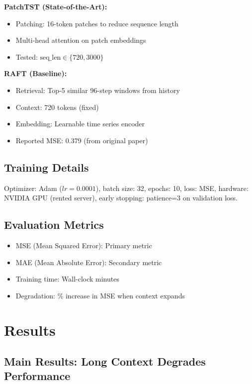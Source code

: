 \documentclass[10pt,twocolumn,letterpaper]{article}
\begin{document}
\noindent\textbf{PatchTST (State-of-the-Art):}
\begin{itemize}
    \item Patching: 16-token patches to reduce sequence length
    \item Multi-head attention on patch embeddings
    \item Tested: $\text{seq\_len} \in \{720, 3000\}$
\end{itemize}

\noindent\textbf{RAFT (Baseline):}
\begin{itemize}
    \item Retrieval: Top-5 similar 96-step windows from history
    \item Context: 720 tokens (fixed)
    \item Embedding: Learnable time series encoder
    \item Reported MSE: 0.379 (from original paper)
\end{itemize}

\subsection{Training Details}
Optimizer: Adam ($lr=0.0001$), batch size: 32, epochs: 10, loss: MSE, hardware: NVIDIA GPU (rented server), early stopping: patience=3 on validation loss.

\subsection{Evaluation Metrics}
\begin{itemize}
    \item MSE (Mean Squared Error): Primary metric
    \item MAE (Mean Absolute Error): Secondary metric
    \item Training time: Wall-clock minutes
    \item Degradation: \% increase in MSE when context expands
\end{itemize}

\section{Results}

\subsection{Main Results: Long Context Degrades Performance}
\end{document}
